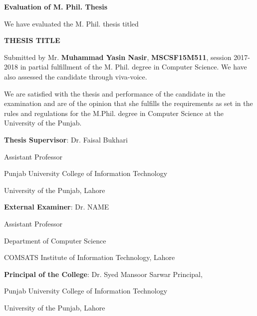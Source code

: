
\begin{center}
    

\large{\textbf{Evaluation of M. Phil. Thesis}}
\end{center}

We have evaluated the M. Phil. thesis titled
\begin{center}
\textbf{THESIS TITLE}
\end{center}

Submitted by Mr. \textbf{Muhammad Yasin Nasir}, \textbf{MSCSF15M511}, session 2017-2018 in partial fulfillment of the M. Phil. degree in Computer Science. We have also assessed the candidate through viva-voice.

We are satisfied with the thesis and performance of the candidate in the examination and are of the opinion that she fulfills the requirements as set in the rules and regulations for the M.Phil. degree in Computer Science at the University of the Punjab.

\bigskip
\bigskip
 \textbf{Thesis Supervisor}:	\hfill Dr. Faisal Bukhari

\hfill Assistant Professor

\hfill Punjab University College of Information Technology

\hfill University of the Punjab, Lahore


\bigskip

\bigskip
\textbf{External Examiner}: \hfill Dr. NAME

   \hfill Assistant Professor 

\hfill Department of Computer Science

  \hfill COMSATS Institute of Information Technology, Lahore


\bigskip

\bigskip
\textbf{Principal of the College}:  \hfill Dr. Syed Mansoor Sarwar
Principal, 

\hfill Punjab University College of Information Technology

\hfill University of the Punjab, Lahore
